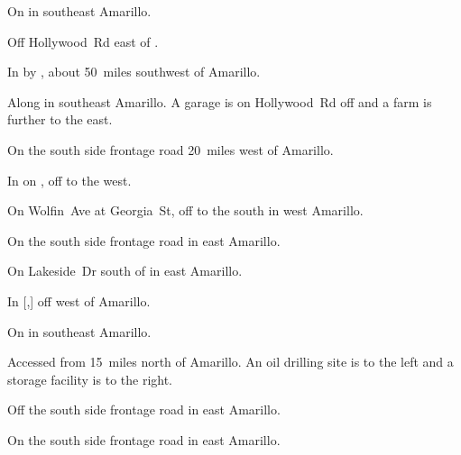 
\begin{LocationList}

\Location{\GarageHQ \Garage}
On  in southeast Amarillo.

Off  Hollywood~Rd east of .

In  by , about 50~miles southwest of Amarillo.

Along  in southeast Amarillo.
A garage is on Hollywood~Rd off  and a farm is further to the east.

On the south side  frontage road 20~miles west of Amarillo.

In  on , off  to the west.

On Wolfin~Ave at Georgia~St, off  to the south in west Amarillo.

On the south side  frontage road in east Amarillo.

\Location{\TruckStop \Gas \Rest \Service \Weigh}
On  Lakeside~Dr south of  in east Amarillo.

In [,] off  west of Amarillo.

On  in southeast Amarillo.

Accessed from  15~miles north of Amarillo.
An oil drilling site is to the left and a storage facility is to the right.

Off the south side  frontage road in east Amarillo.

On the south side  frontage road in east Amarillo.

\end{LocationList}
